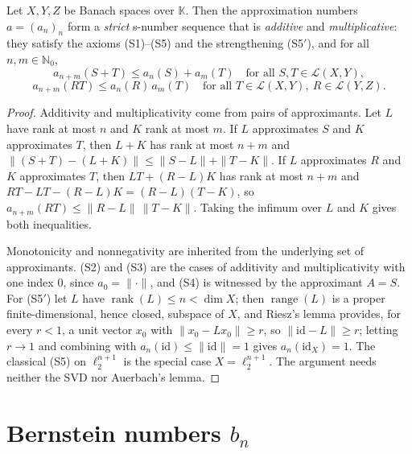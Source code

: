 \begin{theorem}
\label{thm:approx-is-snumber}
\leanok
{}
Let $X, Y, Z$ be Banach spaces over $\mathbb{K}$. Then the approximation
numbers $a = (a_n)_n$ form a \emph{strict} s-number sequence that is
\emph{additive} and \emph{multiplicative}: they satisfy the axioms
(S1)--(S5) and the strengthening (S5$'$), and for all
$n, m \in \mathbb{N}_0$,
\[
  a_{n+m}(S + T) \le a_n(S) + a_m(T)
  \quad \text{for all } S, T \in \mathcal{L}(X, Y),
\]
\[
  a_{n+m}(R T) \le a_n(R) \, a_m(T)
  \quad \text{for all } T \in \mathcal{L}(X, Y), \ R \in \mathcal{L}(Y, Z).
\]
\end{theorem}
\begin{proof}
\leanok
Additivity and multiplicativity come from pairs of approximants. Let $L$
have rank at most $n$ and $K$ rank at most $m$. If $L$ approximates $S$ and
$K$ approximates $T$, then $L + K$ has rank at most $n + m$ and
$\|(S + T) - (L + K)\| \le \|S - L\| + \|T - K\|$. If $L$ approximates $R$
and $K$ approximates $T$, then $L T + (R - L) K$ has rank at most $n + m$ and
$R T - L T - (R - L) K = (R - L)(T - K)$, so
$a_{n+m}(R T) \le \|R - L\| \, \|T - K\|$. Taking the infimum over $L$ and
$K$ gives both inequalities.

Monotonicity and nonnegativity are inherited from the underlying set of
approximants. (S2) and (S3) are the cases of additivity and
multiplicativity with one index $0$, since $a_0 = \|\cdot\|$, and (S4) is
witnessed by the approximant $A = S$. For (S5$'$) let $L$ have
$\operatorname{rank}(L) \le n < \dim X$; then $\operatorname{range}(L)$
is a proper finite-dimensional, hence closed, subspace of $X$, and Riesz's
lemma provides, for every $r < 1$, a unit vector $x_0$ with
$\|x_0 - L x_0\| \ge r$, so $\|\mathrm{id} - L\| \ge r$; letting
$r \to 1$ and combining with $a_n(\mathrm{id}) \le \|\mathrm{id}\| = 1$
gives $a_n(\mathrm{id}_X) = 1$. The classical (S5) on $\ell_2^{n+1}$ is the
special case $X = \ell_2^{n+1}$. The argument needs neither the SVD nor
Auerbach's lemma.
\end{proof}

\section{Bernstein numbers $b_n$}
\label{sec:bern}


